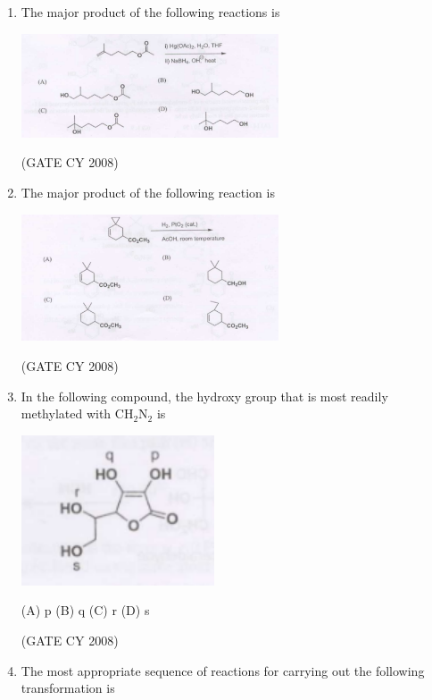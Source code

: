 \documentclass[12pt]{article}
\begin{document}
\begin{enumerate}
\item The major product of the following reactions is

\begin{center}
\includegraphics[width=0.6\textwidth]{figs/q46.png}
\end{center}    \hfill{(GATE CY 2008)}


\item The major product of the following reaction is

\begin{center}
\includegraphics[width=0.6\textwidth]{figs/q47.png}
\end{center}    \hfill{(GATE CY 2008)}


\item In the following compound, the hydroxy group that is most readily methylated with CH$_2$N$_2$ is

\begin{center}
\includegraphics[width=0.45\textwidth]{figs/q48.png}
\end{center}

\begin{multicols}{2}
 (A) p (B) q  (C) r  (D) s
\end{multicols}
     \hfill{(GATE CY 2008)}


\item The most appropriate sequence of reactions for carrying out the following transformation is


\end{enumerate}
\end{document}
